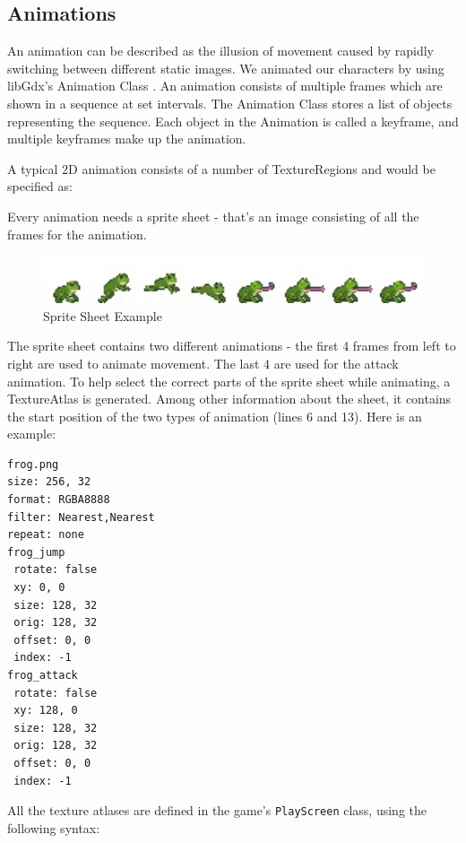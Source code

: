 \documentclass[12p]{article}
\begin{document}
\subsection{Animations} \label{DocAnimations}

An animation can be described as the illusion of movement caused by rapidly switching between different static images. We animated our characters by using libGdx's Animation Class \cite{libGdxAnimClass}. An animation consists of multiple frames which are shown in a sequence at set intervals. The Animation Class stores a list of objects representing the sequence. Each object in the Animation is called a keyframe, and multiple keyframes make up the animation.

A typical 2D animation consists of a number of TextureRegions and would be specified as:


Every animation needs a sprite sheet - that's an image consisting of all the frames for the animation.

\begin{figure}[ht]
  \center
  \includegraphics[width=1\textwidth]{Documentation/frog.jpg}
  \caption{Sprite Sheet Example}
  \label{SpriteSheetExample}
\end{figure}

The sprite sheet contains two different animations - the first 4 frames from left to right are used to animate movement. The last 4 are used for the attack animation. To help select the correct parts of the sprite sheet while animating, a TextureAtlas is generated. Among other information about the sheet, it contains the start position of the two types of animation (lines 6 and 13). Here is an example:

\begin{verbatim}
frog.png
size: 256, 32
format: RGBA8888
filter: Nearest,Nearest
repeat: none
frog_jump
 rotate: false
 xy: 0, 0
 size: 128, 32
 orig: 128, 32
 offset: 0, 0
 index: -1
frog_attack
 rotate: false
 xy: 128, 0
 size: 128, 32
 orig: 128, 32
 offset: 0, 0
 index: -1
\end{verbatim}

All the texture atlases are defined in the game's \texttt{PlayScreen} class, using the following syntax:
\end{document}
